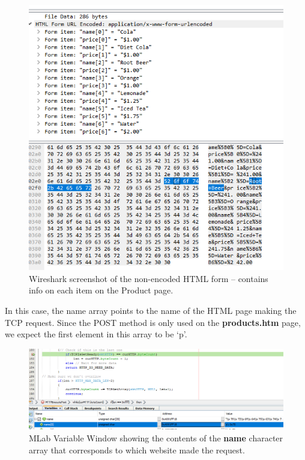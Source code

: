 \documentclass[a4paper, 12pt]{article}
\begin{document}
\begin{figure}[H]
\centering
\includegraphics[width=\textwidth]{img-post-wireshark.PNG}
\caption{Wireshark screenshot of the non-encoded HTML form -- contains info on each item on the Product page.}
\label{fig:img-post-wireshark}
\end{figure}

In this case, the name array points to the name of the HTML page making the TCP request. Since the POST method is only used on the \textbf{products.htm} page, we expect the first element in this array to be `p'.

\begin{figure}[H]
\centering
\includegraphics[width=\textwidth]{img-post-variable.PNG}
\caption{MLab Variable Window showing the contents of the \textbf{name} character array that corresponds to which website made the request.}
\label{fig:img-post-varaible}
\end{figure}
\end{document}
